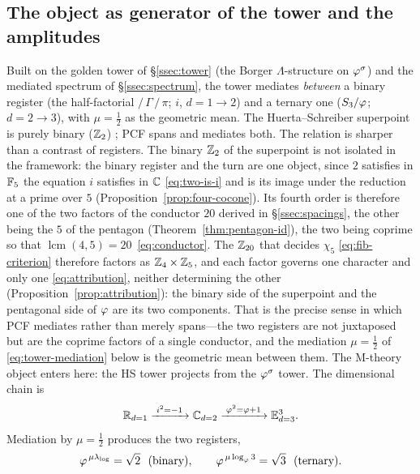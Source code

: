 \subsection{The object as generator of the tower and the amplitudes}\label{ssec:p-tower}
Built on the golden tower of \S\ref{ssec:tower} (the Borger $\Lambda$-structure on
$\varphi^{\sigma}$) and the mediated spectrum of \S\ref{ssec:spectrum}, the tower mediates
\emph{between} a binary register (the half-factorial $/\,\Gamma\,/\,\pi$;
$i$, $d{=}1{\to}2$) and a ternary one ($S_{3}/\varphi$; $d{=}2{\to}3$), with $\mu=\tfrac12$ as
the geometric mean. The Huerta--Schreiber superpoint is purely binary ($\mathbb{Z}_{2}$)
\cite{huerta2018m}; PCF spans and mediates both. The relation is sharper than a contrast of
registers. The binary $\mathbb{Z}_{2}$ of the superpoint is not isolated in the framework: the binary
register and the turn are one object, since $2$ satisfies in $\mathbb{F}_5$ the equation $i$ satisfies in
$\mathbb{C}$ \eqref{eq:two-is-i} and is its image under the reduction at a prime over $5$
(Proposition~\ref{prop:four-cocone}). Its fourth order is therefore one of the two factors of the
conductor $20$ derived in \S\ref{ssec:spacings}, the other being the $5$ of the pentagon
(Theorem~\ref{thm:pentagon-id}), the two being coprime so that
$\operatorname{lcm}(4,5)=20$~\eqref{eq:conductor}. The $\mathbb{Z}_{20}$ that decides $\chi_5$
\eqref{eq:fib-criterion} therefore factors as $\mathbb{Z}_{4}\times\mathbb{Z}_{5}$, and each factor governs one
character and only one \eqref{eq:attribution}, neither determining the other
(Proposition~\ref{prop:attribution}): the binary side of the
superpoint and the pentagonal side of $\varphi$ are its two components. That is the precise sense
in which PCF mediates rather than merely spans---the two registers are not juxtaposed but are the
coprime factors of a single conductor, and the mediation $\mu=\tfrac12$ of
\eqref{eq:tower-mediation} below is the geometric mean between them.
The M-theory object enters here: the HS tower
projects from the $\varphi^{\sigma}$ tower. The dimensional chain is
\begin{equation}\label{eq:dim-chain}
  \mathbb{R}_{d=1}\xrightarrow{\;i^{2}=-1\;}\mathbb{C}_{d=2}
  \xrightarrow{\;\varphi^{2}=\varphi+1\;}\mathbb{E}^{3}_{d=3}.
\end{equation}
Mediation by $\mu=\tfrac12$ produces the two registers,
\begin{equation}\label{eq:tower-mediation}
  \golden^{\,\mu\lng}=\sqrt{2}\ \ (\text{binary}),\qquad
  \golden^{\,\mu\log_{\golden}3}=\sqrt{3}\ \ (\text{ternary}).
\end{equation}
